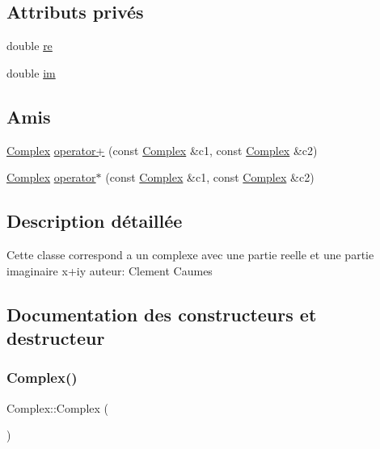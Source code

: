 \subsection*{Attributs privés}
\begin{DoxyCompactItemize}
\item 
double \hyperlink{classComplex_a843ce2f85af4c57db9063c86f3cd9607}{re}
\item 
double \hyperlink{classComplex_a776d595d5a1b576e9136cbc6bac0589c}{im}
\end{DoxyCompactItemize}
\subsection*{Amis}
\begin{DoxyCompactItemize}
\item 
\hyperlink{classComplex}{Complex} \hyperlink{classComplex_a3946e00b31192f0b4628357b86131044}{operator+} (const \hyperlink{classComplex}{Complex} \&c1, const \hyperlink{classComplex}{Complex} \&c2)
\item 
\hyperlink{classComplex}{Complex} \hyperlink{classComplex_aadf4af6aafa8eea50ea802bce62c954c}{operator$\ast$} (const \hyperlink{classComplex}{Complex} \&c1, const \hyperlink{classComplex}{Complex} \&c2)
\end{DoxyCompactItemize}


\subsection{Description détaillée}
Cette classe correspond a un complexe avec une partie reelle et une partie imaginaire x+iy auteur\+: Clement Caumes 

\subsection{Documentation des constructeurs et destructeur}
\mbox{\label{classComplex_a43b9f07cdf697c71b5fd506a6cc80b8f}} 
\subsubsection{\texorpdfstring{Complex()}{Complex()}\hspace{0.1cm}{\footnotesize\ttfamily [1/2]}}
{\footnotesize\ttfamily Complex\+::\+Complex (\begin{DoxyParamCaption}{ }\end{DoxyParamCaption})}

